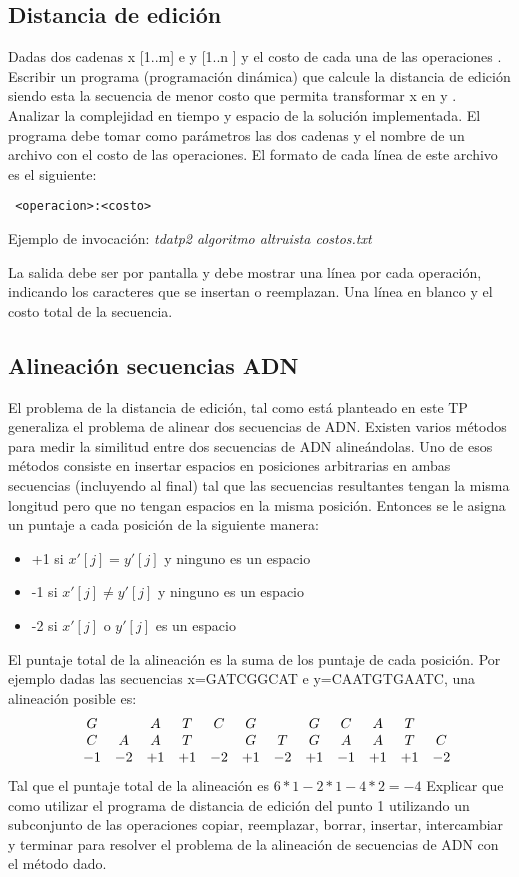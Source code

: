 \documentclass[12pt]{article}
\begin{document}
\newpage
\subsection{Distancia de edición}
Dadas dos cadenas x [1..m] e y [1..n ] y el costo de cada una de las operaciones
. Escribir un programa (programación dinámica) que calcule la distancia de edición
siendo esta la secuencia de menor costo que permita transformar x en y .
Analizar la complejidad en tiempo y espacio de la solución implementada.
El programa debe tomar como parámetros las dos cadenas y el nombre de un
archivo con el costo de las operaciones. El formato de cada línea de este archivo
es el siguiente:

\verb# <operacion>:<costo>#

Ejemplo de invocación: \emph{tdatp2 algoritmo altruista costos.txt}

La salida debe ser por pantalla y debe mostrar una línea por cada operación,
indicando los caracteres que se insertan o reemplazan. Una línea en blanco y el costo total de
la secuencia.

\subsection{Alineación secuencias ADN}
El problema de la distancia de edición, tal como está planteado en este TP generaliza el
problema de alinear dos secuencias de ADN. Existen varios métodos para medir la
similitud entre dos secuencias de ADN alineándolas. Uno de esos métodos consiste en
insertar espacios en posiciones arbitrarias en ambas secuencias (incluyendo al final) tal
que las secuencias resultantes tengan la misma longitud pero que no tengan espacios en
la misma posición. Entonces se le asigna un puntaje a cada posición de la siguiente
manera:

\begin{itemize}
	\item +1 si $x'[j]=y'[j]$ y ninguno es un espacio
	\item -1 si $x'[j]\neq y'[j]$ y ninguno es un espacio
	\item -2 si $x'[j]$ o $y'[j]$ es un espacio
\end{itemize}

El puntaje total de la alineación es la suma de los puntaje de cada posición. Por ejemplo
dadas las secuencias x=GATCGGCAT e y=CAATGTGAATC, una alineación posible
es:
\[
\begin{array}{ccccccccccccc}
  &G &\space &A &T &C &G &\space &G &C &A &T &\space  \\
  &C &A &A &T &\space &G &T &G &A &A &T &C	\\
  &-1 &-2 &+1 &+1 &-2 &+1 &-2 &+1 &-1 &+1 &+1 &-2
\end{array}
\]
Tal que el puntaje total de la alineación es $6*1-2*1-4*2=-4$
Explicar que como utilizar el programa de distancia de edición del punto 1
utilizando un subconjunto de las operaciones copiar, reemplazar, borrar, insertar,
intercambiar y terminar para resolver el problema de la alineación de secuencias de
ADN con el método dado.
\end{document}
